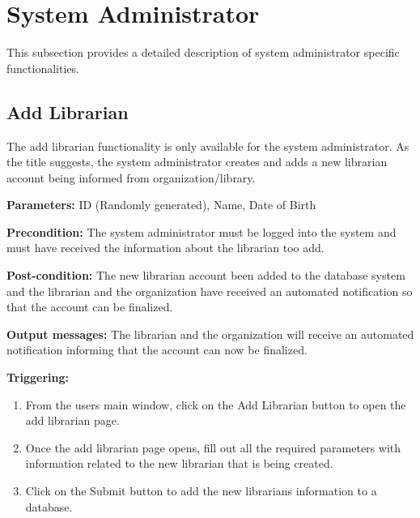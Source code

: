\section{System Administrator}
\label{operation:System Administrator}

This subsection provides a detailed description of system administrator specific functionalities.

\subsection{Add Librarian}

The add librarian functionality is only available for the system administrator. As the title suggests, the system administrator creates and adds a new librarian account being informed from organization/library. 

\begin{description}

\item \textbf{Parameters:} ID (Randomly generated), Name, Date of Birth

\item \textbf{Precondition:} The system administrator must be logged into the system and must have received the information about the librarian too add. 

\item \textbf{Post-condition:} The new librarian account been added to the database system and the librarian and the organization have received an automated notification so that the account can be finalized. 

\item \textbf{Output messages:} The librarian and the organization will receive an automated notification informing that the account can now be finalized. 

\item \textbf{Triggering:}
\begin{enumerate}

\item From the users main window, click on the Add Librarian button to open the add librarian page. 

\item Once the add librarian page opens, fill out all the required parameters with information related to the new librarian that is being created. 

\item Click on the Submit button to add the new librarians information to a database. 

\end{enumerate}

\end{description}

